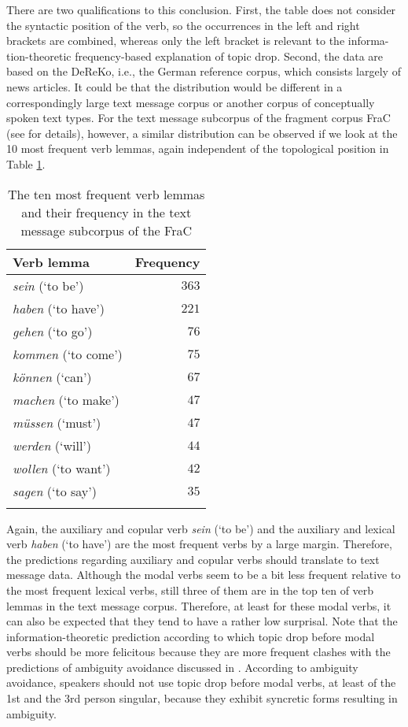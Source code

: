 There are two qualifications to this conclusion.
First, the table does not consider the syntactic position of the verb, so the occurrences in the left and right brackets are combined, whereas only the left bracket is relevant to the informa- tion-theoretic frequency-based explanation of topic drop.
Second, the data are based on the DeReKo, i.e., the German reference corpus,  which consists largely of news articles.
It could be that the distribution would be different in a correspondingly large text message corpus or another corpus of conceptually spoken text types. 
For the text message subcorpus of the fragment corpus FraC (see  for details), however, a similar distribution can be observed if we look at the 10 most frequent verb lemmas, again independent of the topological position in Table \ref{tab:verb.freq.frac}.

\begin{table}
\caption{The ten most frequent verb lemmas and their frequency in the text message subcorpus  of the FraC}
\centering
\begin{tabular}{lr}
\lsptoprule
Verb lemma & Frequency \\
\midrule
\textit{sein} (`to be') &  $363$ \\
\textit{haben} (`to have') &  $221$\\
\textit{gehen} (`to go') & $76$ \\ 
\textit{kommen} (`to come') & $75$ \\
\textit{können} (`can') & $67$ \\
\textit{machen} (`to make') & $47$ \\ 
\textit{müssen} (`must') & $47$ \\
\textit{werden} (`will') & $44$ \\ 
\textit{wollen} (`to want') & $42$ \\
\textit{sagen} (`to say') & $35$ \\
\lspbottomrule
\end{tabular}
\label{tab:verb.freq.frac}
\end{table}

Again, the auxiliary and copular verb \textit{sein} (`to be') and the auxiliary and lexical verb \textit{haben} (`to have') are the most frequent verbs by a large margin.
Therefore, the predictions regarding auxiliary and copular verbs should translate to text message data. 
Although the modal verbs seem to be a bit less frequent relative to the most frequent lexical verbs, still three of them are in the top ten of verb lemmas in the text message corpus.
Therefore, at least for these modal verbs, it can also be expected that they tend to have a rather low surprisal.
Note that the information-theoretic prediction according to which topic drop before modal verbs should be more felicitous because they are more frequent clashes with the predictions of ambiguity avoidance  discussed in .
According to ambiguity avoidance,  speakers should not use topic drop before modal verbs, at least of the 1st and the 3rd person singular, because they exhibit syncretic  forms resulting in ambiguity.

